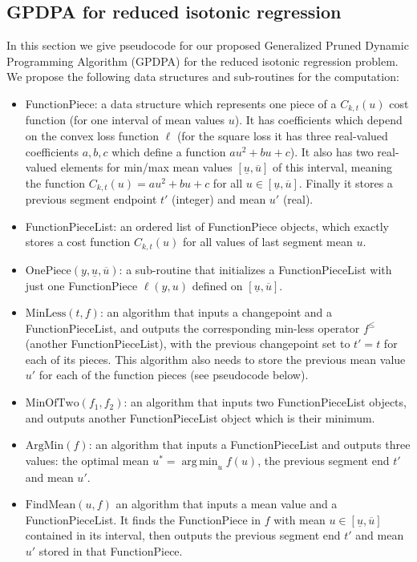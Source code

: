 \documentclass{article}
\newcommand{\FCC}{C}
\DeclareMathOperator*{\argmin}{arg\,min}
\begin{document}
\subsection{GPDPA for reduced isotonic regression}
In this section we give pseudocode for our proposed Generalized Pruned
Dynamic Programming Algorithm (GPDPA) for the reduced isotonic
regression problem. We propose the following data structures and
sub-routines for the computation:
\begin{itemize}
\item FunctionPiece: a data structure which represents one piece of a
  $C_{k,t}(u)$ cost function (for one interval of mean values $u$). It
  has coefficients which depend on the convex loss function $\ell$
  (for the square loss it has three real-valued coefficients $a,b,c$
  which define a function $au^2 + bu + c$). It also has two
  real-valued elements for min/max mean values
  $[\underline u, \overline u]$ of this interval, meaning the function
  $C_{k,t}(u)=au^2 + bu + c$ for all
  $u\in[\underline u, \overline u]$. Finally it stores a previous
  segment endpoint $t'$ (integer) and mean $u'$ (real).
\item FunctionPieceList: an ordered list of FunctionPiece objects,
  which exactly stores a cost function $\FCC_{k,t}(u)$ for all values
  of last segment mean $u$.
\item $\text{OnePiece}(y, \underline u, \overline u)$: a sub-routine
  that initializes a FunctionPieceList with just one FunctionPiece
  $\ell(y, u)$ defined on $[\underline u, \overline u]$.
\item $\text{MinLess}(t, f)$: an algorithm that inputs a changepoint
  and a FunctionPieceList, and outputs the corresponding min-less
  operator $f^\leq$ (another FunctionPieceList), with the previous
  changepoint set to $t'=t$ for each of its pieces. This algorithm
  also needs to store the previous mean value $u'$ for each of the
  function pieces (see pseudocode below). 
\item $\text{MinOfTwo} (f_1, f_2)$: an algorithm that inputs two
  FunctionPieceList objects, and outputs another FunctionPieceList
  object which is their minimum. 
\item $\text{ArgMin}(f)$: an algorithm that inputs a FunctionPieceList
  and outputs three values: the optimal mean $u^*=\argmin_u f(u)$, the
  previous segment end $t'$ and mean $u'$.
\item $\text{FindMean}(u, f)$ an algorithm that inputs a mean value
  and a FunctionPieceList. It finds the FunctionPiece in $f$ with mean
  $u\in[\underline u, \overline u]$ contained in its interval, then
  outputs the previous segment end $t'$ and mean $u'$ stored in that
  FunctionPiece.
\end{itemize}
\end{document}
